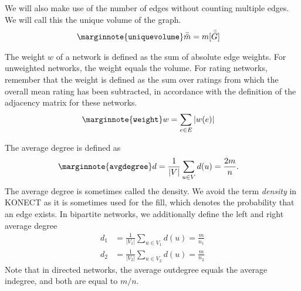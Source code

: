 \documentclass{article}
\begin{document}
We will also make use of the number of edges without counting multiple
edges.  We will call this the unique volume of the graph. 
\begin{align}
  \marginnote{\texttt{uniquevolume}}
  \bar{\bar m} &= m[\bar{\bar{G}}]
\end{align}

The weight $w$ of a network is defined as the sum of absolute edge weights.  For
unweighted networks, the weight equals the volume. For rating networks,
remember that the weight is defined as the sum over ratings from which the overall
mean rating has been subtracted, in accordance with the definition of
the adjacency matrix for these networks. 
\begin{align}
  \marginnote{\texttt{weight}}
  w &= \sum_{e \in E} |w(e)|
\end{align}

The average degree is defined as
\begin{align}
  \marginnote{\texttt{avgdegree}}
  d &= \frac 1 {|V|} \sum_{u\in V} d(u) = \frac {2m} n . 
\end{align}
The average degree is sometimes called the density.  We avoid the term
\emph{density} in KONECT as it is sometimes used for the fill, which
denotes the probability that an edge exists.  In bipartite networks, we
additionally define the left and right average degree
\begin{align}
  d_1 &= \frac 1 {|V_1|} \sum_{u \in V_1} d(u) = \frac m {n_1} \\
  d_2 &= \frac 1 {|V_2|} \sum_{u \in V_2} d(u) = \frac m {n_2} 
\end{align}
Note that in directed networks, the average outdegree equals the average
indegree, and both are equal to $m/n$. 
\end{document}
